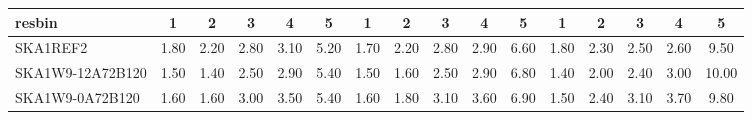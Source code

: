 \begin{table}[!htp]
{{\begin{tabular}{|lccccc||ccccc||ccccc|}
 resbin  &1 & 2 & 3 & 4 & 5 & 1 & 2 & 3 & 4 & 5 & 1 & 2 & 3 & 4 & 5 \\ \hline
SKA1REF2 & 1.80 \cellcolor{blue!60.00} & 2.20 \cellcolor{red!60.00} & 2.80 \cellcolor{green!43.20} & 3.10 \cellcolor{orange!32.00} & 5.20 \cellcolor{purple!18.00} & 1.70 \cellcolor{blue!60.00} & 2.20 \cellcolor{red!60.00} & 2.80 \cellcolor{green!39.00} & 2.90 \cellcolor{orange!18.00} & 6.60 \cellcolor{purple!18.00} & 1.80 \cellcolor{blue!60.00} & 2.30 \cellcolor{red!49.50} & 2.50 \cellcolor{green!24.00} & 2.60 \cellcolor{orange!18.00} & 9.50 \cellcolor{purple!18.00}\\ \hline 
SKA1W9-12A72B120 & 1.50 \cellcolor{blue!18.00} & 1.40 \cellcolor{red!18.00} & 2.50 \cellcolor{green!18.00} & 2.90 \cellcolor{orange!18.00} & 5.40 \cellcolor{purple!60.00} & 1.50 \cellcolor{blue!18.00} & 1.60 \cellcolor{red!18.00} & 2.50 \cellcolor{green!18.00} & 2.90 \cellcolor{orange!18.00} & 6.80 \cellcolor{purple!46.00} & 1.40 \cellcolor{blue!18.00} & 2.00 \cellcolor{red!18.00} & 2.40 \cellcolor{green!18.00} & 3.00 \cellcolor{orange!33.27} & 10.00 \cellcolor{purple!60.00}\\ \hline 
SKA1W9-0A72B120 & 1.60 \cellcolor{blue!32.00} & 1.60 \cellcolor{red!28.50} & 3.00 \cellcolor{green!60.00} & 3.50 \cellcolor{orange!60.00} & 5.40 \cellcolor{purple!60.00} & 1.60 \cellcolor{blue!39.00} & 1.80 \cellcolor{red!32.00} & 3.10 \cellcolor{green!60.00} & 3.60 \cellcolor{orange!60.00} & 6.90 \cellcolor{purple!60.00} & 1.50 \cellcolor{blue!28.50} & 2.40 \cellcolor{red!60.00} & 3.10 \cellcolor{green!60.00} & 3.70 \cellcolor{orange!60.00} & 9.80 \cellcolor{purple!43.20}\\ \hline 
\end{tabular}}
\hspace{1cm} 
}
\end{table}
